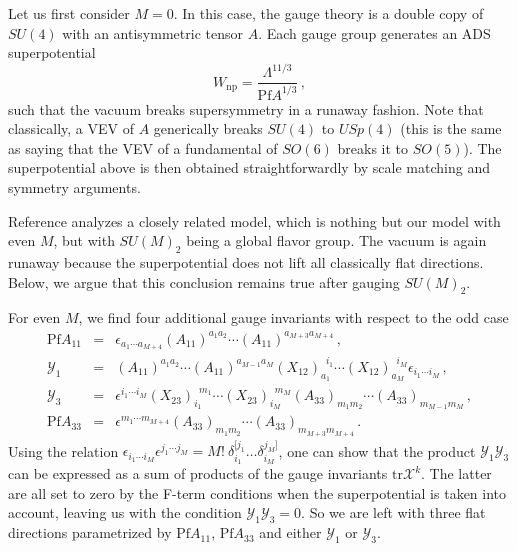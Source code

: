 \documentclass[a4paper,12pt]{article}
\begin{document}
{Let us first consider $M=0$. In this case, the gauge theory is a double copy of $SU(4)$ with an antisymmetric tensor $A$. Each gauge group generates an ADS superpotential
\begin{equation}
	W_{\text{np}} = \frac{\Lambda^{11/3}}{\mathrm{Pf} A^{1/3}} \, ,
\end{equation} 
such that the vacuum breaks supersymmetry in a runaway fashion. Note that classically, a VEV of $A$ generically breaks $SU(4)$ to $USp(4)$ (this is the same as saying that the VEV of a fundamental of $SO(6)$ breaks it to $SO(5)$). The superpotential above is then obtained straightforwardly by scale matching and symmetry arguments. 

Reference \cite{Affleck:1984xz} analyzes a closely related model, which is nothing but our model with even $M$, but with $SU(M)_2$ being a global flavor group. The vacuum is again runaway because the superpotential does not lift all classically flat directions. Below, we argue that this conclusion remains true after gauging $SU(M)_2$.

For even $M$, we find four additional gauge invariants with respect to the odd case
\begin{equation}
	\begin{array}{ccl}
		\mathrm{Pf} A_{11} &=& \epsilon_{a_1 \cdots a_{M+4}} (A_{11})^{a_1 a_2} \cdots (A_{11})^{a_{M+3} a_{M+4}} \, , \\[.1 cm]
		\mathcal{Y}_1  &=&  (A_{11})^{a_1 a_2} \cdots (A_{11})^{a_{M-1} a_M}(X_{12})_{a_1}^{\,\,\, i_1}\cdots(X_{12})_{a_{M}}^{\,\,\, i_M} \epsilon_{i_1 \cdots i_{M}} \, , \\[.1 cm]
		\mathcal{Y}_3  &=& \epsilon^{i_1 \cdots i_{M}}(X_{23})_{i_1}^{\,\,\, m_1}\cdots(X_{23})_{i_{M}}^{\,\,\, m_M} (A_{33})_{m_1 m_2} \cdots (A_{33})_{m_{M-1} m_M} \, , \\[.1 cm]
		\mathrm{Pf} A_{33} &=& \epsilon^{m_1 \cdots m_{M+4}} (A_{33})_{m_1 m_2} \cdots (A_{33})_{m_{M+3} m_{M+4}} \, .
	\end{array} 
\end{equation}
Using the relation $\epsilon_{i_1 \cdots i_{M}}\epsilon^{j_1 \cdots j_{M}}=M!\  \delta^{[j_1}_{i_1}\dots \delta^{j_M]}_{i_M}$, one can show that the product $\mathcal{Y}_1 \mathcal{Y}_3$ can be expressed as a sum of products of the gauge invariants $\mathrm{tr}\mathcal{X}^k$. The latter are all set to zero by the F-term conditions when the superpotential is taken into account, leaving us with the condition $\mathcal{Y}_1 \mathcal{Y}_3=0$. So we are left with three flat directions  parametrized by $\mathrm{Pf}A_{11}$, $\mathrm{Pf}A_{33}$ and either $\mathcal{Y}_1$ or $\mathcal{Y}_3$. 

}
\end{document}
